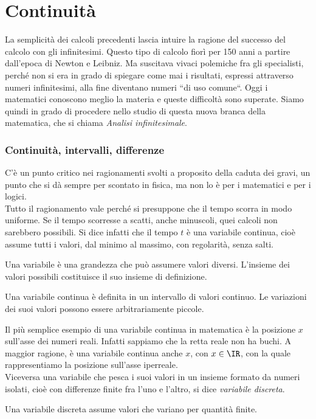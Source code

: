 \section{Continuità}
\label{04_diffcomtinuità}
La semplicità dei calcoli precedenti lascia intuire la ragione del successo 
del
calcolo con gli infinitesimi.  Questo tipo di calcolo fiorì per 150 anni a 
partire dall'epoca di Newton e Leibniz. Ma suscitava vivaci polemiche fra
gli specialisti, perché non si era in grado di spiegare come mai i 
risultati, espressi attraverso numeri infinitesimi, alla fine diventano numeri
``di uso comune``.
Oggi i matematici conoscono meglio la materia e queste difficoltà sono 
superate.
Siamo quindi in grado di procedere nello studio di questa nuova branca 
della 
matematica, che si chiama \emph{Analisi infinitesimale}.

\subsubsection{Continuità, intervalli, differenze}
\label{04_diffcontinterv}
C'è un punto critico nei ragionamenti svolti a proposito della caduta dei 
gravi,
un punto che si dà sempre per scontato in fisica, ma non lo è per i matematici
e per i logici.\\
Tutto il ragionamento vale perché si presuppone che il tempo scorra in modo
uniforme. Se il tempo scorresse a scatti, anche minuscoli, quei calcoli non
sarebbero possibili. Si dice infatti che il tempo $t$ è una variabile
continua, cioè assume tutti i valori, dal minimo al massimo, con regolarità,
senza salti.

\begin{definizione}
 Una variabile è una grandezza che può assumere valori diversi.
 L'insieme dei valori possibili costituisce il suo insieme di definizione.
\end{definizione}

\begin{definizione}
 Una variabile continua è definita in un intervallo di valori continuo.
 Le variazioni dei suoi valori possono essere arbitrariamente piccole.
\end{definizione}

Il più semplice esempio di una variabile continua in matematica è la 
posizione $x$ sull'asse dei numeri reali. Infatti sappiamo che la retta reale 
non
ha buchi. A maggior ragione, è una variabile continua anche $x$, con $x\in\IR$,
con la quale rappresentiamo la posizione sull'asse iperreale. \\
Viceversa una variabile che pesca i suoi valori in un insieme formato da 
numeri isolati,
cioè con differenze finite fra l'uno e l'altro, si dice \emph{variabile 
discreta}. 
\begin{definizione}
 Una variabile discreta assume valori che variano per quantità finite.
\end{definizione}


